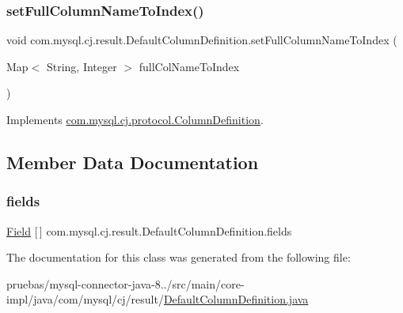 \subsubsection{\texorpdfstring{set\+Full\+Column\+Name\+To\+Index()}{setFullColumnNameToIndex()}}
{\footnotesize\ttfamily void com.\+mysql.\+cj.\+result.\+Default\+Column\+Definition.\+set\+Full\+Column\+Name\+To\+Index (\begin{DoxyParamCaption}\item[{Map$<$ String, Integer $>$}]{full\+Col\+Name\+To\+Index }\end{DoxyParamCaption})}



Implements \mbox{\hyperlink{interfacecom_1_1mysql_1_1cj_1_1protocol_1_1_column_definition_a75168874688cd04aa48f269036d2227d}{com.\+mysql.\+cj.\+protocol.\+Column\+Definition}}.



\subsection{Member Data Documentation}
\mbox{\label{classcom_1_1mysql_1_1cj_1_1result_1_1_default_column_definition_a3f4d762bd95f857062625fddb3a02102}} 
\subsubsection{\texorpdfstring{fields}{fields}}
{\footnotesize\ttfamily \mbox{\hyperlink{classcom_1_1mysql_1_1cj_1_1result_1_1_field}{Field}} \mbox{[}$\,$\mbox{]} com.\+mysql.\+cj.\+result.\+Default\+Column\+Definition.\+fields\hspace{0.3cm}{\ttfamily [protected]}}



The documentation for this class was generated from the following file\+:\begin{DoxyCompactItemize}
\item 
pruebas/mysql-\/connector-\/java-\/8../src/main/core-\/impl/java/com/mysql/cj/result/\mbox{\hyperlink{_default_column_definition_8java}{Default\+Column\+Definition.\+java}}\end{DoxyCompactItemize}

